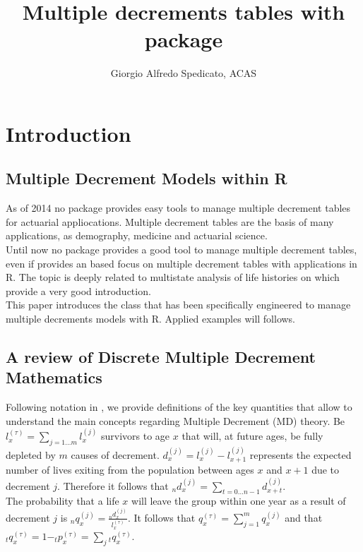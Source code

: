 \documentclass[nojss]{jss}
\author{Giorgio Alfredo Spedicato, ACAS}
\title{Multiple decrements tables with \pkg{lifecontingencies} package}
\begin{document}
\section{Introduction}

\subsection{Multiple Decrement Models within R}

As of 2014 no  package provides easy tools to manage multiple
decrement tables for actuarial appliocations. Multiple decrement tables are the basis of many applications, as demography, medicine and actuarial science.\\
Until now no  package provides a good tool to manage multiple
decrement tables, even if \cite{deshmukh2012multiple} provides an 
based focus on multiple decrement tables with applications in R. The topic is deeply related to multistate analysis of life histories on which \cite{willekens2014multistate} provide a very good introduction.\\

This paper introduces the  class that has been specifically engineered
to manage multiple decrements models with R. Applied examples will follows.\\

\subsection{A review of Discrete Multiple Decrement Mathematics}

Following notation in \cite{finanMLC}, we provide definitions of the key quantities that allow to understand the main concepts regarding Multiple Decrement (MD) theory. Be $l_x^{(\tau )} = \sum\limits_{j = 1 \ldots m} {l_x^{(j)}}$ survivors to age $x$ that will, at future ages, be fully depleted by $m$ causes of decrement. $d_{x}^{(j)}=l_{x}^{(j)}-l_{x+1}^{(j)}$ represents the expected number of lives exiting from the population between ages $x$ and $x + 1$ due to decrement $j$. Therefore it follows that $_nd_x^{(j)} = \sum\limits_{t = 0 \ldots n - 1} {d_{x + t}^{(j)}}$.\\
The probability that a life $x$ will leave the group within one year as a result of decrement $j$ is $_nq_x^{(j)} = \frac{{_nd_x^{(j)}}}{{l_x^{(\tau )}}}$. It follows that $q_x^{(\tau )} = \sum\limits_{j = 1}^m {q_x^{(j)}}$ and that $_tq_x^{(\tau )} = 1{ - _t}p_x^{(\tau )} = \sum\limits_j {_tq_x^{(\tau )}}$.
\end{document}
